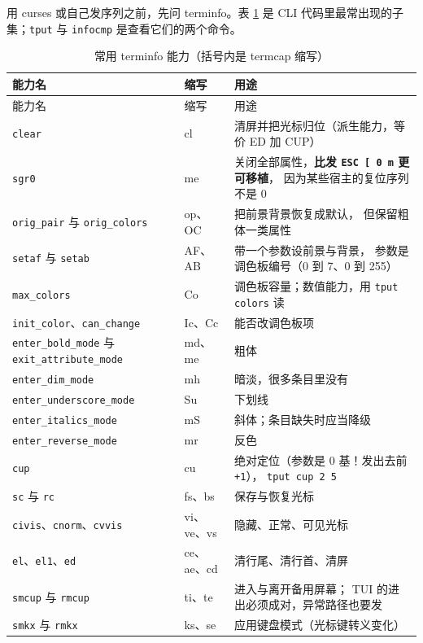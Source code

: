 \documentclass[12pt,a4paper,fontset=fandol]{ctexbook}
\newcommand{\Tp}[1]{\texttt{#1}}
\newcommand{\Bk}{\allowbreak}
\begin{document}
用 curses 或自己发序列之前，先问 terminfo。表 \ref{tab:terminfo} 是
CLI 代码里最常出现的子集；\lstinline{tput} 与 \lstinline{infocmp}
是查看它们的两个命令。

\begin{longtable}{@{}>{\raggedright\arraybackslash}p{}
                 >{\raggedright\arraybackslash}p{}
                 >{\raggedright\arraybackslash}p{}@{}}
\caption{常用 terminfo 能力（括号内是 termcap 缩写）}
\label{tab:terminfo} \\
\toprule
能力名 & 缩写 & 用途 \\
\midrule
\endfirsthead
\toprule
能力名 & 缩写 & 用途 \\
\midrule
\endhead
\Tp{clear} & cl & 清屏并把光标归位（派生能力，等价 ED 加 CUP） \\
\Tp{sgr0} & me & 关闭全部属性，\textbf{比发 \Tp{ESC [ 0 m} 更可移植}，
因为某些宿主的复位序列不是 0 \\
\Tp{orig\_pair} 与 \Tp{orig\_colors} & op、OC & 把前景背景恢复成默认，
但保留粗体一类属性 \\
\Tp{setaf} 与 \Tp{setab} & AF、AB & 带一个参数设前景与背景，
参数是调色板编号（0 到 7、0 到 255） \\
\Tp{max\_colors} & Co & 调色板容量；数值能力，用
\lstinline|tput colors| 读 \\
\Tp{init\_color}、\Tp{can\_change} & Ic、Cc & 能否改调色板项 \\
\Tp{enter\Bk\_bold\Bk\_mode} 与 \Tp{exit\Bk\_attribute\Bk\_mode} & md、me & 粗体 \\
\Tp{enter\Bk\_dim\Bk\_mode} & mh & 暗淡，很多条目里没有 \\
\Tp{enter\Bk\_underscore\Bk\_mode} & Su & 下划线 \\
\Tp{enter\Bk\_italics\Bk\_mode} & mS & 斜体；条目缺失时应当降级 \\
\Tp{enter\Bk\_reverse\Bk\_mode} & mr & 反色 \\
\Tp{cup} & cu & 绝对定位（参数是 0 基！发出去前 \Tp{+1}），
\lstinline|tput cup 2 5| \\
\Tp{sc} 与 \Tp{rc} & fs、bs & 保存与恢复光标 \\
\Tp{civis}、\Tp{cnorm}、\Tp{cvvis} & vi、ve、vs & 隐藏、正常、可见光标 \\
\Tp{el}、\Tp{el1}、\Tp{ed} & ce、ae、cd & 清行尾、清行首、清屏 \\
\Tp{smcup} 与 \Tp{rmcup} & ti、te & 进入与离开备用屏幕；
TUI 的进出必须成对，异常路径也要发 \\
\Tp{smkx} 与 \Tp{rmkx} & ks、se & 应用键盘模式（光标键转义变化） \\

\end{longtable}
\end{document}
